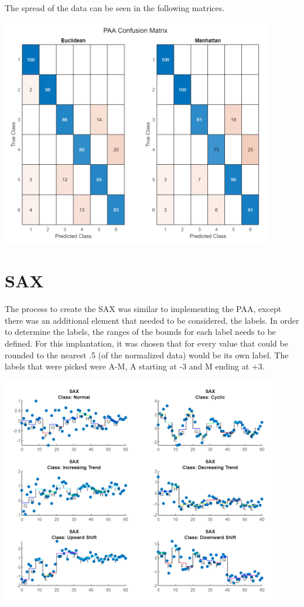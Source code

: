 \documentclass{article}
\begin{document}
The spread of the data can be seen in the following matrices.
\begin{center}
    {\includegraphics[height=10cm]{graphics/confusedpaa.png}\centering}
\end{center}

\newpage
\section{SAX}
The process to create the SAX was similar to implementing the PAA, except there
was an additional element that needed to be considered, the labels.  In order to
determine the labels, the ranges of the bounds for each label needs to be defined.
For this implantation, it was chosen that for every value that could be rounded 
to the nearest .5 (of the normalized data) would be its own label.  The labels
that were picked were A-M, A starting at -3 and M ending at +3. 

\begin{center}
    {\includegraphics[height=10cm]{graphics/saxplot.png}\centering}
\end{center}
\end{document}
